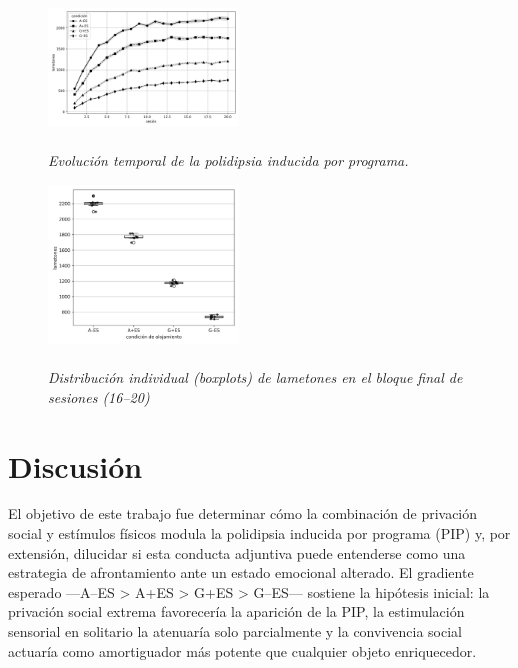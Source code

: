 \documentclass[12pt,a4paper]{article}
\begin{document}
\begin{multicols}{2}
\begin{figure}[H]
\begin{doublespace}
\captionsetup{labelfont=bf, labelsep=none}
\caption{\textit{\protect\\Evolución temporal de la polidipsia inducida por programa.}}
\label{fig:figura1}
\end{doublespace}
\centering
\includegraphics[width=0.45\textwidth]{figura1.png}
\end{figure}

\begin{figure}[H]
\begin{doublespace}
\captionsetup{labelfont=bf, labelsep=none}    
\caption{\textit{\protect\\Distribución individual (boxplots) de lametones en el bloque final de sesiones (16–20)}}
\label{fig:figura2}
\end{doublespace}
\centering
\includegraphics[width=0.45\textwidth]{figura2.png}
\end{figure}


\section{Discusión}

El objetivo de este trabajo fue determinar cómo la combinación de privación social y estímulos físicos modula la polidipsia inducida por programa (PIP) y, por extensión, dilucidar si esta conducta adjuntiva puede entenderse como una estrategia de afrontamiento ante un estado emocional alterado. El gradiente esperado —A--ES > A+ES > G+ES > G--ES— sostiene la hipótesis inicial: la privación social extrema favorecería la aparición de la PIP, la estimulación sensorial en solitario la atenuaría solo parcialmente y la convivencia social actuaría como amortiguador más potente que cualquier objeto enriquecedor.


\end{multicols}
\end{document}
